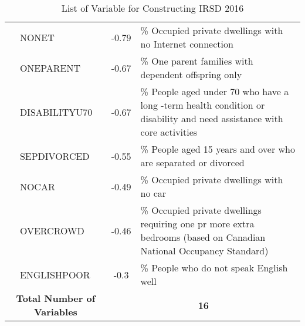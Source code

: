 \begin{table}[t]
{\begin{tabular}{c p{}c p{}}
                        & NONET                          & -0.79            & \% Occupied private dwellings   with no Internet connection                                                               \\ \cline{2-4}
                        & ONEPARENT                      & -0.67            & \% One parent families with   dependent offspring only                                                                    \\ \cline{2-4}
                        & DISABILITYU70                  & -0.67            & \% People aged under 70 who have   a long -term health condition or disability and need assistance with core   activities \\ \cline{2-4}
                        & SEPDIVORCED                    & -0.55            & \% People aged 15 years and over   who are separated or divorced                                                          \\ \cline{2-4}
                        & NOCAR                          & -0.49            & \% Occupied private dwellings   with no car                                                                               \\ \cline{2-4}
                        & OVERCROWD                      & -0.46            & \% Occupied private dwellings   requiring one pr more extra bedrooms (based on Canadian National Occupancy   Standard)    \\ \cline{2-4}
                        & ENGLISHPOOR                    & -0.3             & \% People who do not speak   English well                                                                                 \\ \hline
\multicolumn{2}{c}{\textbf{Total Number   of Variables}} & \multicolumn{2}{c}{\textbf{16}}                                                                                                              \\ \hline
\end{tabular}
}
\caption{List of Variable for Constructing IRSD 2016}
\label{tbl-IRSDloading16}
\end{table}
